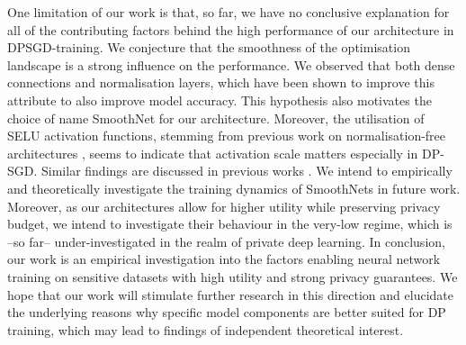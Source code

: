 \documentclass[nohyperref]{article}
\theoremstyle{plain}
\theoremstyle{definition}
\theoremstyle{remark}
\begin{document}
One limitation of our work is that, so far, we have no conclusive explanation for all of the contributing factors behind the high performance of our architecture in \acs{DPSGD}-training. We conjecture that the smoothness of the optimisation landscape is a strong influence on the performance. We observed that both dense connections and normalisation layers, which have been shown to improve this attribute \cite{li2018visualizing, santurkar2019does} to also improve model accuracy. This hypothesis also motivates the choice of name SmoothNet for our architecture. Moreover, the utilisation of SELU activation functions, stemming from previous work on normalisation-free architectures \citep{klambauer2017self}, seems to indicate that activation scale matters especially in DP-SGD. Similar findings are discussed in previous works \citep{papernot2020tempered, klause2022differentially}. We intend to empirically and theoretically investigate the training dynamics of SmoothNets in future work. Moreover, as our architectures allow for higher utility while preserving privacy budget, we intend to investigate their behaviour in the very-low  regime, which is --so far-- under-investigated in the realm of private deep learning.
In conclusion, our work is an empirical investigation into the factors enabling neural network training on sensitive datasets with high utility and strong privacy guarantees. We hope that our work will stimulate further research in this direction and elucidate the underlying reasons why specific model components are better suited for \acs{DP} training, which may lead to findings of independent theoretical interest.

\newpage




\newpage
\appendix
\onecolumn
\end{document}
